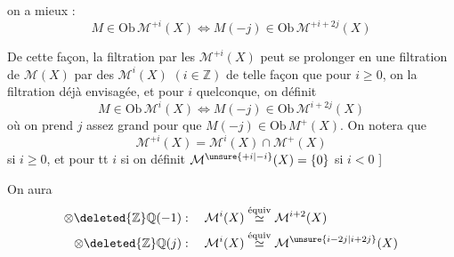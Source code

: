 on a mieux : %
\[
M\in\mathrm{Ob}\,\mathcal M^{+i}(X)\Longleftrightarrow M(-j)\in\mathrm{Ob}\,\mathcal M^{+i+2j}(X) %
\]

De cette façon, la filtration  par les %
$\mathcal M^{+i}(X)$  peut se prolonger en une filtration %
de $\mathcal M(X)$ par des $\mathcal M^i(X)$ $(i\in\mathbb Z)$ de %
telle façon que pour $i\geq0$, on  la filtration %
déjà  envisagée, et pour $i$ quelconque, %
on définit %
\[
M\in\mathrm{Ob}\,\mathcal M^i(X)\Longleftrightarrow M(-j)\in\mathrm{Ob}\,\mathcal M^{i+2j}(X) %
\]
où on prend $j$ assez grand pour que %
$M(-j)\in\mathrm{Ob}\,M^+(X)$. On notera que %
\[
\mathcal M^{+i}(X)=\mathcal M^i(X)\cap\mathcal M^+(X) %
\]
si $i\geq0$, et pour tt $i$ si on définit %
$\mathcal M^{\unsure{+i|-i}}(X)=\{0\}$ si $i<0$ ] %

On aura %
\[
\begin{aligned}
\otimes\deleted{\mathbb Z}\mathbb Q(-1)&:\quad\mathcal M^i(X)\overset{\text{équiv}}{\simeq}\mathcal M^{i+2}(X)\\ %
\otimes\deleted{\mathbb Z}\mathbb Q(j)&:\quad\mathcal M^i(X)\overset{\text{équiv}}{\simeq}\mathcal M^{\unsure{i-2j|i+2j}}(X) %
\end{aligned}
\]

